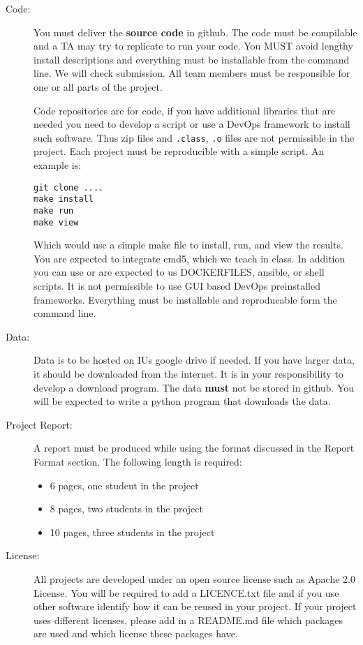 \begin{description}
\item[Code:]
You must deliver the \textbf{source code} in github. The code must be
compilable and a TA may try to replicate to run your code. You MUST
avoid lengthy install descriptions and everything must be installable
from the command line. We will check submission. All team members must
be responsible for one or all parts of the project.

Code repositories are for code, if you have additional libraries that
are needed you need to develop a script or use a DevOps framework to
install such software. Thus zip files and \verb|.class|, \verb|.o| files are not
permissible in the project. Each project must be reproducible with a
simple script. An example is:

\begin{verbatim}
git clone ....
make install
make run
make view
\end{verbatim}

Which would use a simple make file to install, run, and view the
results.  You are expected to integrate cmd5, which we teach in
class. In addition you can use or are expected to us DOCKERFILES,
ansible, or shell scripts. It is not permissible to use GUI based
DevOps preinstalled frameworks. Everything must be installable and
reproducable form the command line.

\item[Data:] Data is to be hosted on IUs google drive if needed. If
  you have larger data, it should be downloaded from the internet. It
  is in your responsibility to develop a download program. The data
  \textbf{must} not be stored in github. You will be expected to write
  a python program that downloads the data.
\item[Project Report:] A report must be produced while using the
  format discussed in the Report Format section. The following length
  is required:

\begin{itemize}
\item
  6 pages, one student in the project
\item
  8 pages, two students in the project
\item
  10 pages, three students in the project
\end{itemize}

\item[License:] All projects are developed under an open source
  license such as Apache 2.0 License. You will be required to add a
  LICENCE.txt file and if you use other software identify how it can
  be reused in your project. If your project uses different licenses,
  please add in a README.md file which packages are used and which
  license these packages have.
\end{description}

